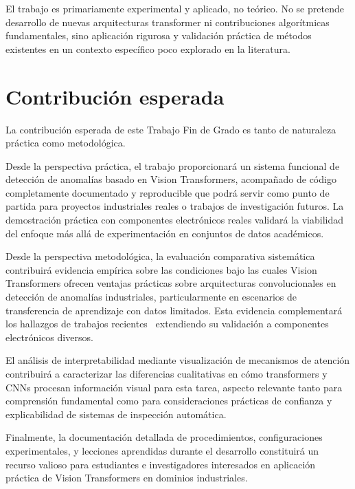El trabajo es primariamente experimental y aplicado, no teórico. No se pretende desarrollo de nuevas arquitecturas transformer ni contribuciones algorítmicas fundamentales, sino aplicación rigurosa y validación práctica de métodos existentes en un contexto específico poco explorado en la literatura.


\section{Contribución esperada}

La contribución esperada de este Trabajo Fin de Grado es tanto de naturaleza práctica como metodológica.

Desde la perspectiva práctica, el trabajo proporcionará un sistema funcional de detección de anomalías basado en Vision Transformers, acompañado de código completamente documentado y reproducible que podrá servir como punto de partida para proyectos industriales reales o trabajos de investigación futuros. La demostración práctica con componentes electrónicos reales validará la viabilidad del enfoque más allá de experimentación en conjuntos de datos académicos.

Desde la perspectiva metodológica, la evaluación comparativa sistemática contribuirá evidencia empírica sobre las condiciones bajo las cuales Vision Transformers ofrecen ventajas prácticas sobre arquitecturas convolucionales en detección de anomalías industriales, particularmente en escenarios de transferencia de aprendizaje con datos limitados. Esta evidencia complementará los hallazgos de trabajos recientes~\cite{huang2025semiconductor,zhang2025exploring,alber2024evaluating} extendiendo su validación a componentes electrónicos diversos.

El análisis de interpretabilidad mediante visualización de mecanismos de atención contribuirá a caracterizar las diferencias cualitativas en cómo transformers y CNNs procesan información visual para esta tarea, aspecto relevante tanto para comprensión fundamental como para consideraciones prácticas de confianza y explicabilidad de sistemas de inspección automática.

Finalmente, la documentación detallada de procedimientos, configuraciones experimentales, y lecciones aprendidas durante el desarrollo constituirá un recurso valioso para estudiantes e investigadores interesados en aplicación práctica de Vision Transformers en dominios industriales.